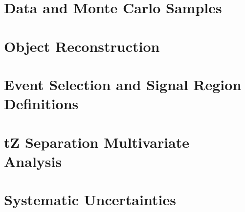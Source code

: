 \documentclass[NOTE, atlasdraft=true, texlive=2016, UKenglish]{\ATLASLATEXPATH atlasdoc}
\begin{document}
\section{Data and Monte Carlo Samples}
\label{sec:data}

 
\section{Object Reconstruction}
\label{sec:obj}

 
\section{Event Selection and Signal Region Definitions}
\label{sec:evt_selection}

 
\section{tZ Separation Multivariate Analysis}
\label{sec:tZ_bdt}


\section{Systematic Uncertainties}
\label{sec:sys}
                                                                              
                                                                                                                             
\end{document}
